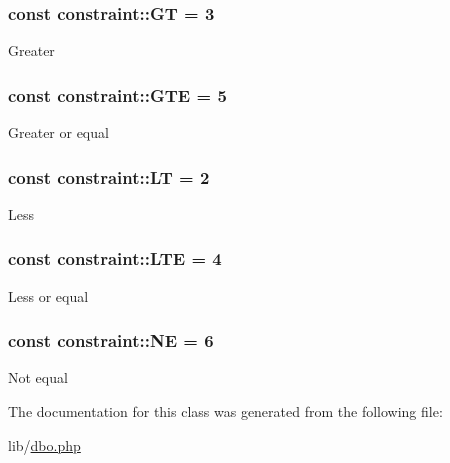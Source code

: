\subsubsection[{G\+T}]{\setlength{\rightskip}{0pt plus 5cm}const constraint\+::\+G\+T = 3}\label{classconstraint_a0bc0ebe8be69587ccea58b06117a76ca}
Greater \hypertarget{classconstraint_a7271610e95f862dfcbfeebdc22c1be05}{}
\subsubsection[{G\+T\+E}]{\setlength{\rightskip}{0pt plus 5cm}const constraint\+::\+G\+T\+E = 5}\label{classconstraint_a7271610e95f862dfcbfeebdc22c1be05}
Greater or equal \hypertarget{classconstraint_a356487cccf4f7e43df1cedf5c4b494eb}{}
\subsubsection[{L\+T}]{\setlength{\rightskip}{0pt plus 5cm}const constraint\+::\+L\+T = 2}\label{classconstraint_a356487cccf4f7e43df1cedf5c4b494eb}
Less \hypertarget{classconstraint_a869d7d56db8db1bd423e5664c40d9251}{}
\subsubsection[{L\+T\+E}]{\setlength{\rightskip}{0pt plus 5cm}const constraint\+::\+L\+T\+E = 4}\label{classconstraint_a869d7d56db8db1bd423e5664c40d9251}
Less or equal \hypertarget{classconstraint_a7e396087ac8d1599de8c52809d56f601}{}
\subsubsection[{N\+E}]{\setlength{\rightskip}{0pt plus 5cm}const constraint\+::\+N\+E = 6}\label{classconstraint_a7e396087ac8d1599de8c52809d56f601}
Not equal 

The documentation for this class was generated from the following file\+:\begin{DoxyCompactItemize}
\item 
lib/\hyperlink{dbo_8php}{dbo.\+php}\end{DoxyCompactItemize}
